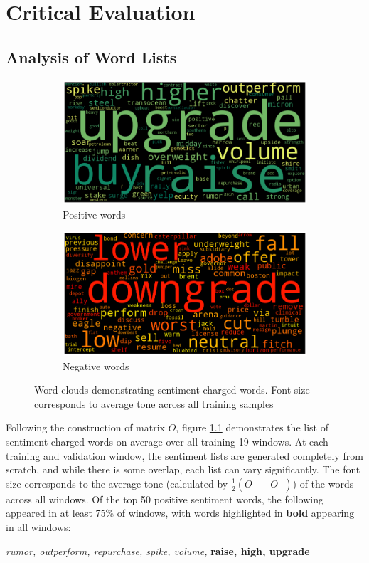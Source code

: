 \chapter{Critical Evaluation}
\label{chap:evaluation}

\section{Analysis of Word Lists}
\begin{figure}[ht]
\begin{subfigure}[b]{\textwidth}
\centering
\includegraphics[scale=0.4]{pics/positive.png}
\caption{Positive words}
\end{subfigure}

\begin{subfigure}[b]{\textwidth}
\centering
\includegraphics[scale=0.4]{pics/negative.png}
\caption{Negative words}
\end{subfigure}
\caption[Word clouds]{Word clouds demonstrating sentiment charged words. Font size corresponds to average tone across all training samples}
\label{wordclouds}
\end{figure}

Following the construction of matrix $O$, figure \ref{wordclouds} demonstrates the list of sentiment charged words on average over all training 19 windows. At each training and validation window, the sentiment lists are generated completely from scratch, and while there is some overlap, each list can vary significantly. The font size corresponds to the average tone (calculated by $\frac{1}{2}(O_+ - O_-)$) of the words across all windows. Of the top 50 positive sentiment words, the following appeared in at least 75\% of windows, with words highlighted in \textbf{bold} appearing in all windows:
\begin{center}
      \textit{rumor, outperform, repurchase, spike, volume,} \textbf{raise, high, upgrade}
\end{center}

